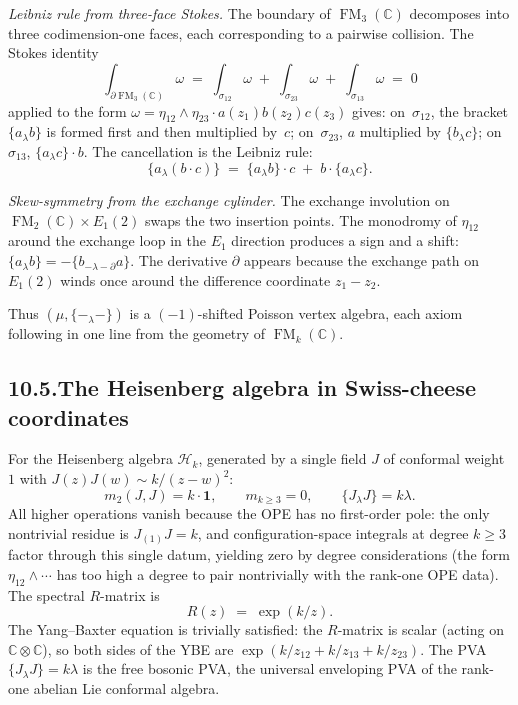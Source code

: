 \documentclass[11pt]{report}
\theoremstyle{definition}
\theoremstyle{remark}
\numberwithin{equation}{section}
\begin{document}
\medskip
\noindent\emph{Leibniz rule from three-face Stokes.}
The boundary of $\operatorname{FM}_3(\mathbb C)$ decomposes into
three codimension-one faces, each corresponding to a pairwise
collision. The Stokes identity
\[
\int_{\partial\operatorname{FM}_3(\mathbb C)}\omega
\;=\;
\int_{\sigma_{12}}\omega
\;+\;
\int_{\sigma_{23}}\omega
\;+\;
\int_{\sigma_{13}}\omega
\;=\;0
\]
applied to the form
$\omega=\eta_{12}\wedge\eta_{23}\cdot a(z_1)b(z_2)c(z_3)$
gives: on~$\sigma_{12}$, the bracket $\{a_\lambda b\}$ is formed
first and then multiplied by~$c$; on~$\sigma_{23}$,
$a$ multiplied by $\{b_\lambda c\}$; on~$\sigma_{13}$,
$\{a_\lambda c\}\cdot b$. The cancellation is the Leibniz rule:
\[
\{a_\lambda(b\cdot c)\}
\;=\;
\{a_\lambda b\}\cdot c
\;+\;
b\cdot\{a_\lambda c\}.
\]

\medskip
\noindent\emph{Skew-symmetry from the exchange cylinder.}
The exchange involution on
$\operatorname{FM}_2(\mathbb C)\times E_1(2)$ swaps the two
insertion points. The monodromy of $\eta_{12}$ around the exchange
loop in the $E_1$ direction produces a sign and a shift:
$\{a_\lambda b\}=-\{b_{-\lambda-\partial}a\}$. The derivative
$\partial$ appears because the exchange path on $E_1(2)$ winds
once around the difference coordinate $z_1-z_2$.

\medskip
\noindent
Thus $(\mu,\{-_\lambda-\})$ is a $(-1)$-shifted Poisson
vertex algebra, each axiom following in one line from the
geometry of $\operatorname{FM}_k(\mathbb C)$.

\subsection*{10.5.\enspace The Heisenberg algebra in Swiss-cheese coordinates}

For the Heisenberg algebra $\mathcal H_k$, generated by a
single field $J$ of conformal weight~$1$ with
$J(z)J(w)\sim k/(z-w)^2$:
\[
m_2(J,J)=k\cdot\mathbf{1},
\qquad
m_{k\ge 3}=0,
\qquad
\{J_\lambda J\}=k\lambda.
\]
All higher operations vanish because the OPE has no first-order
pole: the only nontrivial residue is $J_{(1)}J=k$, and
configuration-space integrals at degree $k\ge 3$ factor through
this single datum, yielding zero by degree considerations
(the form $\eta_{12}\wedge\cdots$ has too high a degree to pair
nontrivially with the rank-one OPE data). The spectral
$R$-matrix is
\[
R(z)\;=\;\exp(k/z).
\]
The Yang--Baxter equation is trivially satisfied: the $R$-matrix is
scalar (acting on $\mathbb C\otimes\mathbb C$), so both sides of
the YBE are $\exp(k/z_{12}+k/z_{13}+k/z_{23})$. The PVA
$\{J_\lambda J\}=k\lambda$ is the free bosonic PVA, the universal
enveloping PVA of the rank-one abelian Lie conformal algebra.
\end{document}
